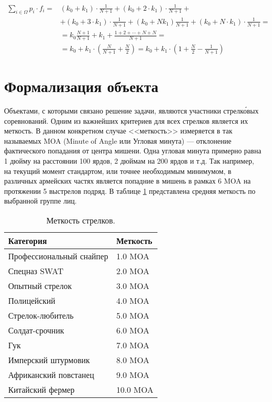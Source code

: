 \begin{equation}
    \label{for:brute}
    \begin{aligned}
        \sum\limits_{i \in \Omega} p_i \cdot f_i = & (k_0 + k_1) \cdot \frac{1}{N + 1} + (k_0 + 2 \cdot k_1) \cdot \frac{1}{N+1} +\\
        & + (k_0 + 3 \cdot k_1) \cdot \frac{1}{N + 1} + (k_0 + Nk_1)\frac{1}{N + 1} + (k_0 + N \cdot k_1) \cdot \frac{1}{N + 1} =\\
        & = k_0\frac{N+1}{N+1}+k_1+\frac{1 + 2 + \cdots + N + N}{N + 1} = \\
        & = k_0 + k_1 \cdot \left(\frac{N}{N + 1} + \frac{N}{2}\right) = k_0 + k_1 \cdot \left(1 + \frac{N}{2} - \frac{1}{N + 1}\right)
    \end{aligned}
\end{equation}

\section{Формализация объекта}
Объектами, с которыми связано решение задачи, являются участники стрелк\'{о}вых соревнований.
Одним из важнейших критериев для всех стрелков является их меткость.
В данном конкретном случае <<меткость>> измеряется в так называемых MOA (Minute of Angle или Угловая минута) --- отклонение фактического попадания от центра мишени. 
Одна угловая минута примерно равна 1 дюйму на расстоянии 100 ярдов, 2 дюймам на 200 ярдов и т.д.
Так например, на текущий момент стандартом, или точнее необходимым минимумом, в различных армейских частях является попадние в мишень в рамках 6 MOA на протяжении 5 выстрелов подряд.
В таблице \ref{tab:moa} представлена средняя меткость по выбранной группе лиц.
\begin{table}[h!]
	\caption{\label{tab:moa} Меткость стрелков.}
	\begin{center}
		\begin{tabular}{| p{10cm} | l |}
            \hline
            Категория & Меткость \\
            \hline
            Профессиональный снайпер & 1.0 MOA \\
            \hline
            Спецназ SWAT & 2.0 MOA \\
            \hline
            Опытный стрелок & 3.0 MOA \\
            \hline
            Полицейский & 4.0 MOA \\
            \hline
            Стрелок-любитель & 5.0 MOA \\
            \hline
            Солдат-срочник & 6.0 MOA \\
            \hline
            Гук & 7.0 MOA \\
            \hline
            Имперский штурмовик & 8.0 MOA \\
            \hline
            Африканский повстанец & 9.0 MOA \\
            \hline
            Китайский фермер & 10.0 MOA \\
            \hline
		\end{tabular}
	\end{center}
\end{table}

